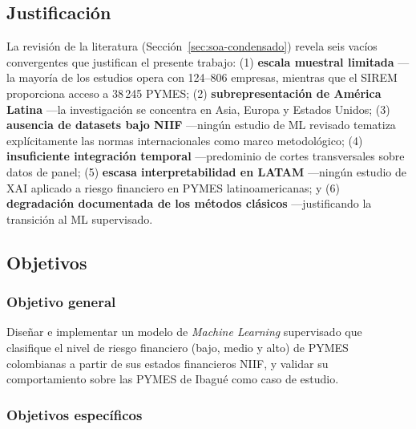 \documentclass[12pt, letterpaper]{article}
\begin{document}
\subsection{Justificaci\'on}
\label{sec:justificacion}

La revisi\'on de la literatura (Secci\'on~\ref{sec:soa-condensado}) revela seis vac\'ios convergentes que justifican el presente trabajo: (1) \textbf{escala muestral limitada} ---la mayor\'ia de los estudios opera con 124--806 empresas, mientras que el SIREM proporciona acceso a 38\,245 PYMES; (2) \textbf{subrepresentaci\'on de Am\'erica Latina} ---la investigaci\'on se concentra en Asia, Europa y Estados Unidos; (3) \textbf{ausencia de datasets bajo NIIF} ---ning\'un estudio de ML revisado tematiza expl\'icitamente las normas internacionales como marco metodol\'ogico; (4) \textbf{insuficiente integraci\'on temporal} ---predominio de cortes transversales sobre datos de panel; (5) \textbf{escasa interpretabilidad en LATAM} ---ning\'un estudio de XAI aplicado a riesgo financiero en PYMES latinoamericanas; y (6) \textbf{degradaci\'on documentada de los m\'etodos cl\'asicos} ---justificando la transici\'on al ML supervisado.

\subsection{Objetivos}
\label{sec:objetivos}

\subsubsection*{Objetivo general}

Dise\~nar e implementar un modelo de \textit{Machine Learning} supervisado que clasifique el nivel de riesgo financiero (bajo, medio y alto) de PYMES colombianas a partir de sus estados financieros NIIF, y validar su comportamiento sobre las PYMES de Ibagu\'e como caso de estudio.

\subsubsection*{Objetivos espec\'ificos}
\end{document}
